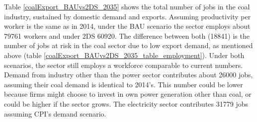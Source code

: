 \documentclass[12pt,english]{article}
\begin{document}
Table \ref{coalExport_BAUvs2DS_2035} shows the total number of jobs in the coal industry, sustained by domestic demand and exports. Assuming productivity per worker is the same as in 2014, under the BAU scenario the sector employs about 79761 workers and under 2DS 60920. The difference between both (18841) is the number of jobs at risk in the coal sector due to low export demand, as mentioned above (table \ref{coalExport_BAUvs2DS_2035_table_employment}). Under both scenarios, the sector still employs a workforce comparable to current numbers. Demand from industry other than the power sector contributes about 26000 jobs, assuming their coal demand is identical to 2014's. This number could be lower because firms might choose to invest in own power generation other than coal, or could be higher if the sector grows. The electricity sector contributes 31779 jobs assuming CPI's demand scenario.





\end{document}
